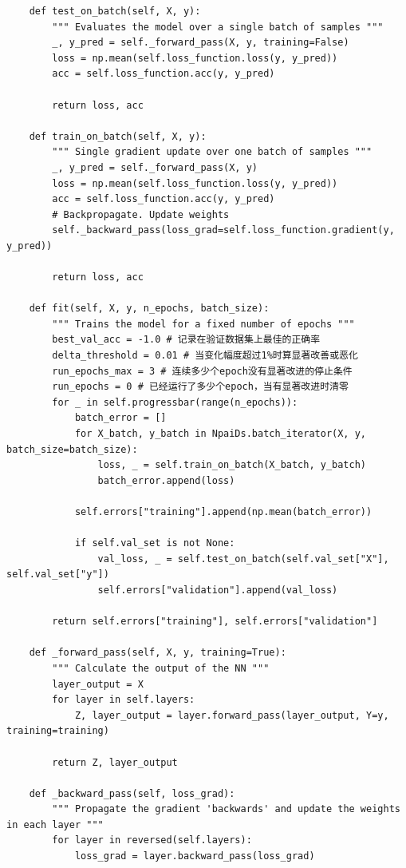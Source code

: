 \documentclass[UTF8]{article}
\begin{document}
\begin{lstlisting}
    def test_on_batch(self, X, y):
        """ Evaluates the model over a single batch of samples """
        _, y_pred = self._forward_pass(X, y, training=False)
        loss = np.mean(self.loss_function.loss(y, y_pred))
        acc = self.loss_function.acc(y, y_pred)

        return loss, acc

    def train_on_batch(self, X, y):
        """ Single gradient update over one batch of samples """
        _, y_pred = self._forward_pass(X, y)
        loss = np.mean(self.loss_function.loss(y, y_pred))
        acc = self.loss_function.acc(y, y_pred)
        # Backpropagate. Update weights
        self._backward_pass(loss_grad=self.loss_function.gradient(y, y_pred))

        return loss, acc

    def fit(self, X, y, n_epochs, batch_size):
        """ Trains the model for a fixed number of epochs """
        best_val_acc = -1.0 # 记录在验证数据集上最佳的正确率
        delta_threshold = 0.01 # 当变化幅度超过1%时算显著改善或恶化
        run_epochs_max = 3 # 连续多少个epoch没有显著改进的停止条件
        run_epochs = 0 # 已经运行了多少个epoch，当有显著改进时清零
        for _ in self.progressbar(range(n_epochs)):
            batch_error = []
            for X_batch, y_batch in NpaiDs.batch_iterator(X, y, batch_size=batch_size):
                loss, _ = self.train_on_batch(X_batch, y_batch)
                batch_error.append(loss)

            self.errors["training"].append(np.mean(batch_error))

            if self.val_set is not None:
                val_loss, _ = self.test_on_batch(self.val_set["X"], self.val_set["y"])
                self.errors["validation"].append(val_loss)

        return self.errors["training"], self.errors["validation"]

    def _forward_pass(self, X, y, training=True):
        """ Calculate the output of the NN """
        layer_output = X
        for layer in self.layers:
            Z, layer_output = layer.forward_pass(layer_output, Y=y, training=training)

        return Z, layer_output

    def _backward_pass(self, loss_grad):
        """ Propagate the gradient 'backwards' and update the weights in each layer """
        for layer in reversed(self.layers):
            loss_grad = layer.backward_pass(loss_grad)


\end{lstlisting}
\end{document}
